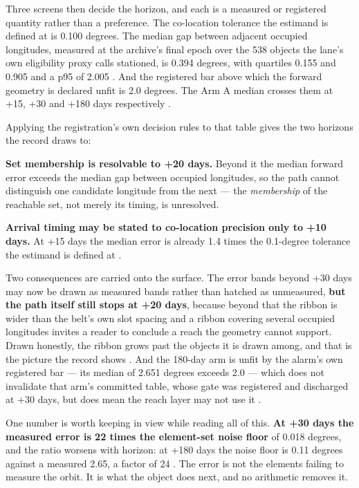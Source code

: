 \documentclass[11pt]{article}
\begin{document}
Three screens then decide the horizon, and each is a measured or registered quantity rather than a preference. The co-location tolerance the estimand is defined at is 0.100 degrees. The median gap between adjacent occupied longitudes, measured at the archive's final epoch over the 538 objects the lane's own eligibility proxy calls stationed, is 0.394 degrees, with quartiles 0.155 and 0.905 and a p95 of 2.005%
. And the registered bar above which the forward geometry is declared unfit is 2.0 degrees. The Arm A median crosses them at +15, +30 and +180 days respectively%
.

Applying the registration's own decision rules to that table gives the two horizons the record draws to:

\textbf{Set membership is resolvable to +20 days.} Beyond it the median forward error exceeds the median gap between occupied longitudes, so the path cannot distinguish one candidate longitude from the next --- the \emph{membership} of the reachable set, not merely its timing, is unresolved.

\textbf{Arrival timing may be stated to co-location precision only to +10 days.} At +15 days the median error is already 1.4 times the 0.1-degree tolerance the estimand is defined at%
.

Two consequences are carried onto the surface. The error bands beyond +30 days may now be drawn as measured bands rather than hatched as unmeasured, \textbf{but the path itself still stops at +20 days}, because beyond that the ribbon is wider than the belt's own slot spacing and a ribbon covering several occupied longitudes invites a reader to conclude a reach the geometry cannot support. Drawn honestly, the ribbon grows past the objects it is drawn among, and that is the picture the record shows%
. And the 180-day arm is unfit by the alarm's own registered bar --- its median of 2.651 degrees exceeds 2.0 --- which does not invalidate that arm's committed table, whose gate was registered and discharged at +30 days, but does mean the reach layer may not use it%
.

One number is worth keeping in view while reading all of this. \textbf{At +30 days the measured error is 22 times the element-set noise floor} of 0.018 degrees, and the ratio worsens with horizon: at +180 days the noise floor is 0.11 degrees against a measured 2.65, a factor of 24%
. The error is not the elements failing to measure the orbit. It is what the object does next, and no arithmetic removes it.
\end{document}
